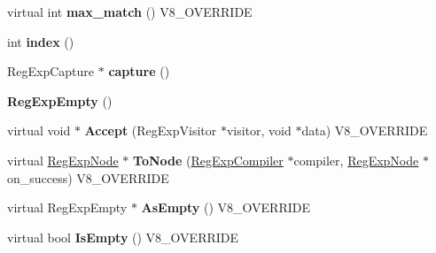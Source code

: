 \begin{DoxyCompactItemize}
\item 
\hypertarget{classv8_1_1internal_1_1_v8___f_i_n_a_l_a0b9dd74bfd4f1172c26a072c44da8669}{}virtual int {\bfseries max\+\_\+match} () V8\+\_\+\+O\+V\+E\+R\+R\+I\+D\+E\label{classv8_1_1internal_1_1_v8___f_i_n_a_l_a0b9dd74bfd4f1172c26a072c44da8669}

\item 
\hypertarget{classv8_1_1internal_1_1_v8___f_i_n_a_l_ae5c4241a042c07df1f4d7fa6fb262023}{}int {\bfseries index} ()\label{classv8_1_1internal_1_1_v8___f_i_n_a_l_ae5c4241a042c07df1f4d7fa6fb262023}

\item 
\hypertarget{classv8_1_1internal_1_1_v8___f_i_n_a_l_a70b4d8ad62ea0cf6b837adf51a62b793}{}Reg\+Exp\+Capture $\ast$ {\bfseries capture} ()\label{classv8_1_1internal_1_1_v8___f_i_n_a_l_a70b4d8ad62ea0cf6b837adf51a62b793}

\item 
\hypertarget{classv8_1_1internal_1_1_v8___f_i_n_a_l_af1532f0724f30cd4158f7e1061628b86}{}{\bfseries Reg\+Exp\+Empty} ()\label{classv8_1_1internal_1_1_v8___f_i_n_a_l_af1532f0724f30cd4158f7e1061628b86}

\item 
\hypertarget{classv8_1_1internal_1_1_v8___f_i_n_a_l_a5a421cb811caf33f244ce08fe3e5ac14}{}virtual void $\ast$ {\bfseries Accept} (Reg\+Exp\+Visitor $\ast$visitor, void $\ast$data) V8\+\_\+\+O\+V\+E\+R\+R\+I\+D\+E\label{classv8_1_1internal_1_1_v8___f_i_n_a_l_a5a421cb811caf33f244ce08fe3e5ac14}

\item 
\hypertarget{classv8_1_1internal_1_1_v8___f_i_n_a_l_aa183d4adede0c6af0c092eeebf59c194}{}virtual \hyperlink{classv8_1_1internal_1_1_reg_exp_node}{Reg\+Exp\+Node} $\ast$ {\bfseries To\+Node} (\hyperlink{classv8_1_1internal_1_1_reg_exp_compiler}{Reg\+Exp\+Compiler} $\ast$compiler, \hyperlink{classv8_1_1internal_1_1_reg_exp_node}{Reg\+Exp\+Node} $\ast$on\+\_\+success) V8\+\_\+\+O\+V\+E\+R\+R\+I\+D\+E\label{classv8_1_1internal_1_1_v8___f_i_n_a_l_aa183d4adede0c6af0c092eeebf59c194}

\item 
\hypertarget{classv8_1_1internal_1_1_v8___f_i_n_a_l_a220646f687acc97bfb89a97927659afb}{}virtual Reg\+Exp\+Empty $\ast$ {\bfseries As\+Empty} () V8\+\_\+\+O\+V\+E\+R\+R\+I\+D\+E\label{classv8_1_1internal_1_1_v8___f_i_n_a_l_a220646f687acc97bfb89a97927659afb}

\item 
\hypertarget{classv8_1_1internal_1_1_v8___f_i_n_a_l_a6802f434b7091761be7634ffeb0aa40f}{}virtual bool {\bfseries Is\+Empty} () V8\+\_\+\+O\+V\+E\+R\+R\+I\+D\+E\label{classv8_1_1internal_1_1_v8___f_i_n_a_l_a6802f434b7091761be7634ffeb0aa40f}


\end{DoxyCompactItemize}
